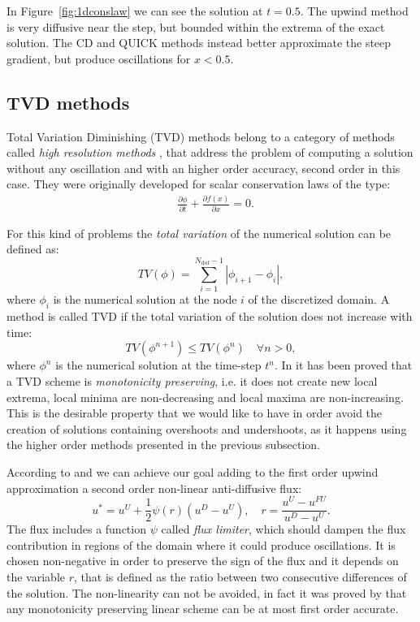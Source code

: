 In Figure~\ref{fig:1dconslaw} we can see the solution at $t=0.5$. The upwind 
method is very diffusive near the step, but bounded within the extrema of the 
exact solution. The CD and QUICK methods instead better approximate the steep 
gradient, but produce oscillations for $x<0.5$.
%
\subsection{TVD methods} \label{subsec:tvd}
Total Variation Diminishing (TVD) methods belong to a category of methods 
called \emph{high resolution methods} \cite{tvd:monotonicity}, that address the problem of computing a 
solution without any oscillation and with an higher order accuracy, second 
order in this case. They were originally developed for scalar conservation laws 
of the type:
\begin{align}
	\label{eq:conslaw} &\frac{\partial \phi}{\partial t} + \frac{\partial f(x) 
	}{\partial x} = 0. 
\end{align}

For this kind of problems the \emph{total variation} of the numerical solution 
can be defined as:
\begin{equation}
	TV(\phi) = \sum_{i=1}^{N_\text{dof}-1} |\phi_{i+1} - \phi_i|,
\end{equation}
where $\phi_i$ is the numerical solution at the node $i$ of the discretized 
domain. A method is called TVD if the total variation of the 
solution does not increase with time: 
\begin{equation}\label{eq:tvdcondition}
	TV(\phi ^{n+1}) \leq TV(\phi^n) \quad \forall n>0,
\end{equation}
where $\phi^n$ is the numerical solution at the time-step $t^n$. In 
\cite{tvd:monotonicity} it has been proved that a TVD scheme is 
\emph{monotonicity preserving}, i.e. it does not create new 
local extrema, local minima are non-decreasing and local maxima are 
non-increasing. This is the desirable property that we would like to have in 
order avoid the creation of solutions containing overshoots and undershoots, 
as it happens using the higher order methods presented in the previous 
subsection.

According to \cite{tvd:sweeby} and \cite{main:darwish} we can achieve our 
goal adding to the first order upwind approximation a second order 
non-linear 
anti-diffusive flux: 
\begin{equation} \label{eq:tvdformula}
u^* = u^U + \frac{1}{2}\psi(r)(u^D - u^U), \quad r = 
\frac{u^U - u^{FU}}{u^D - u^U}.
\end{equation}
The flux includes a function $\psi$ called \emph{flux limiter}, which 
should dampen the flux contribution in regions of the domain where it 
could produce oscillations. It is chosen non-negative in order to preserve the 
sign of the flux and it depends on the variable $r$, that is defined as the 
ratio between two consecutive differences of the solution. The non-linearity 
can not be avoided, in fact it was proved by \textcite{tvd:godunov} that any 
monotonicity preserving linear scheme can be at most first order accurate.

